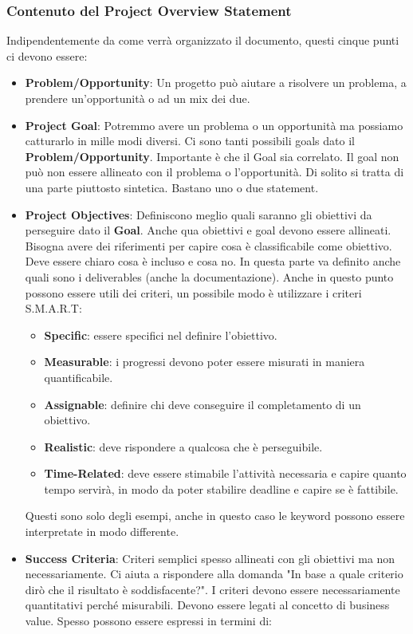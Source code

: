 \subsubsection{Contenuto del Project Overview Statement}
Indipendentemente da come verrà organizzato il documento, questi cinque punti ci devono essere:
\begin{itemize}
	\item \textbf{Problem/Opportunity}: Un progetto può aiutare a risolvere un problema, a prendere un'opportunità o ad un mix dei due.
	\item \textbf{Project Goal}: Potremmo avere un problema o un opportunità ma possiamo catturarlo in mille modi diversi. Ci sono tanti possibili goals dato il \textbf{Problem/Opportunity}. Importante è che il Goal sia correlato. Il goal non può non essere allineato con il problema o l'opportunità. Di solito si tratta di una parte piuttosto sintetica. Bastano uno o due statement.
	\item \textbf{Project Objectives}: Definiscono meglio quali saranno gli obiettivi da perseguire dato il \textbf{Goal}. Anche qua obiettivi e goal devono essere allineati. Bisogna avere dei riferimenti per capire cosa è classificabile come obiettivo. Deve essere chiaro cosa è incluso e cosa no. In questa parte va definito anche quali sono i deliverables (anche la documentazione). Anche in questo punto possono essere utili dei criteri, un possibile modo è utilizzare i criteri S.M.A.R.T:
	\begin{itemize}
		\item \textbf{Specific}: essere specifici nel definire l'obiettivo.
		\item \textbf{Measurable}: i progressi devono poter essere misurati in maniera quantificabile.
		\item \textbf{Assignable}: definire chi deve conseguire il completamento di un obiettivo.
		\item \textbf{Realistic}: deve rispondere a qualcosa che è perseguibile.
		\item \textbf{Time-Related}: deve essere stimabile l'attività necessaria e capire quanto tempo servirà, in modo da poter stabilire deadline e capire se è fattibile.
	\end{itemize}
	Questi sono solo degli esempi, anche in questo caso le keyword possono essere interpretate in modo differente.
	\item \textbf{Success Criteria}: Criteri semplici spesso allineati con gli obiettivi ma non necessariamente. Ci aiuta a rispondere alla domanda "In base a quale criterio dirò che il risultato è soddisfacente?". I criteri devono essere necessariamente quantitativi perché misurabili. Devono essere legati al concetto di business value. Spesso possono essere espressi in termini di:

\end{itemize}
